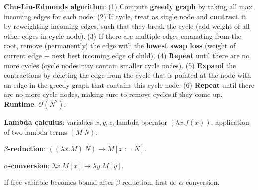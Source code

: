 \documentclass{article}
\newenvironment{topic}[1]
{\begin{tcolorbox}[
  title=#1,
  breakable,
  colback=white,
  colframe=black,
  fonttitle={\bfseries\sffamily},
  sharp corners,
  boxrule=0.5pt,
  boxsep=0.1cm,
  top=0cm,
  bottom=0cm,
  left=0.1cm,
  right=0.1cm,
  enhanced jigsaw,
]}
{\end{tcolorbox}}
\begin{document}
\begin{multicols}{3}
\begin{topic}{Dependency parsing}
  \textbf{Chu-Liu-Edmonds algorithm}: (1) Compute \textbf{greedy graph} by
  taking all max incoming edges for each node. (2) If cycle, treat as single
  node and \textbf{contract} it by reweighting incoming edges, such that they
  break the cycle (add weight of all other edges in cycle node). (3) If there
  are multiple edges emanating from the root, remove (permanently) the edge
  with the \textbf{lowest swap loss} (weight of current edge $-$ next best
  incoming edge of child). (4) \textbf{Repeat} until there are no more cycles
  (cycle nodes may contain smaller cycle nodes). (5) \textbf{Expand} the
  contractions by deleting the edge from the cycle that is pointed at the node
  with an edge in the greedy graph that contains this cycle node. (6)
  \textbf{Repeat} until there are no more cycle nodes, making sure to remove
  cycles if they come up. \textbf{Runtime}: $\mathcal{O}(N^2).$
\end{topic}

\begin{topic}{Semantic parsing}
  \textbf{Lambda calculus}: variables $x,y,z$, lambda operator $(\lambda x.
  f(x))$, application of two lambda terms $(M \; N)$.

  \textbf{$\beta$-reduction}: $((\lambda x. M) \; N) \to M[x := N]$.

  \textbf{$\alpha$-conversion}: $\lambda x. M[x] \to \lambda y. M[y]$.

  If free variable becomes bound after $\beta$-reduction, first do
  $\alpha$-conversion.



\end{topic}
\end{multicols}
\end{document}
